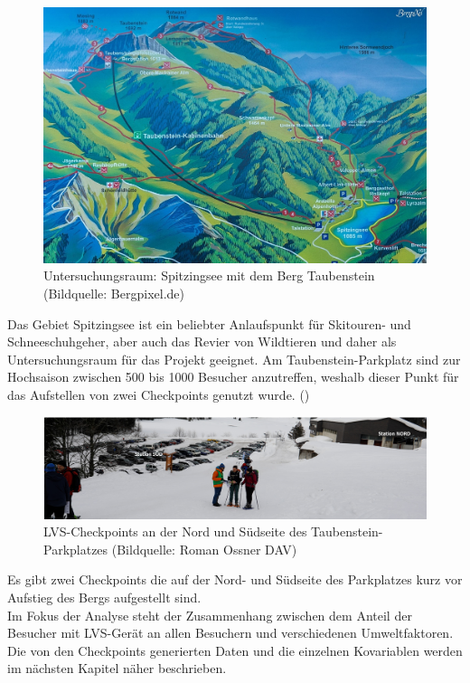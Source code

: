 \documentclass[12pt]{scrreprt}
\begin{document}
\begin{figure}[H]
	\centering
	\includegraphics[width=\linewidth]{plots/spitzingsee}
	\caption{Untersuchungsraum: Spitzingsee mit dem Berg Taubenstein \\ (Bildquelle: Bergpixel.de)}
	\label{pic:spitzingsee}	
\end{figure}
\noindent Das Gebiet Spitzingsee ist ein beliebter Anlaufspunkt für Skitouren- und Schneeschuhgeher, aber auch das Revier von Wildtieren und daher als Untersuchungsraum für das Projekt geeignet. Am Taubenstein-Parkplatz sind zur Hochsaison zwischen 500 bis 1000 Besucher anzutreffen, weshalb dieser Punkt für das Aufstellen von zwei Checkpoints genutzt wurde. (\cite{skigebiete2018}) %
\begin{figure}[H]
	\centering
	\includegraphics[width=\linewidth]{plots/checkpoint}
	\caption{LVS-Checkpoints an der Nord und Südseite des Taubenstein-Parkplatzes (Bildquelle: Roman Ossner DAV)}
	\label{pic:checkpoint}	
\end{figure}
\noindent Es gibt zwei Checkpoints die auf der Nord- und Südseite des Parkplatzes kurz vor Aufstieg des Bergs aufgestellt sind. \\
Im Fokus der Analyse steht der Zusammenhang zwischen dem Anteil der Besucher mit LVS-Gerät an allen Besuchern und verschiedenen Umweltfaktoren. Die von den Checkpoints generierten Daten und die einzelnen Kovariablen werden im nächsten Kapitel näher beschrieben. 
\end{document}
